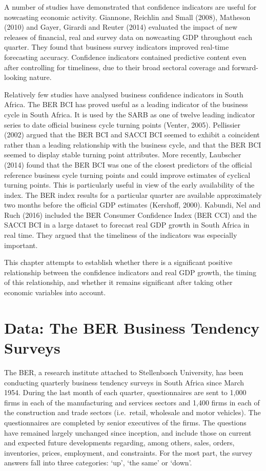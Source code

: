 \documentclass[11pt,]{article}
\begin{document}
A number of studies have demonstrated that confidence indicators are
useful for nowcasting economic activity. Giannone, Reichlin and Small
(2008), Matheson (2010) and Gayer, Girardi and Reuter (2014) evaluated
the impact of new releases of financial, real and survey data on
nowcasting GDP throughout each quarter. They found that business survey
indicators improved real-time forecasting accuracy. Confidence
indicators contained predictive content even after controlling for
timeliness, due to their broad sectoral coverage and forward-looking
nature.

Relatively few studies have analysed business confidence indicators in
South Africa. The BER BCI has proved useful as a leading indicator of
the business cycle in South Africa. It is used by the SARB as one of
twelve leading indicator series to date official business cycle turning
points (Venter, 2005). Pellissier (2002) argued that the BER BCI and
SACCI BCI seemed to exhibit a coincident rather than a leading
relationship with the business cycle, and that the BER BCI seemed to
display stable turning point attributes. More recently, Laubscher (2014)
found that the BER BCI was one of the closest predictors of the official
reference business cycle turning points and could improve estimates of
cyclical turning points. This is particularly useful in view of the
early availability of the index. The BER index results for a particular
quarter are available approximately two months before the official GDP
estimates (Kershoff, 2000). Kabundi, Nel and Ruch (2016) included the
BER Consumer Confidence Index (BER CCI) and the SACCI BCI in a large
dataset to forecast real GDP growth in South Africa in real time. They
argued that the timeliness of the indicators was especially important.

This chapter attempts to establish whether there is a significant
positive relationship between the confidence indicators and real GDP
growth, the timing of this relationship, and whether it remains
significant after taking other economic variables into account.

\section{Data: The BER Business Tendency
Surveys}\label{data-the-ber-business-tendency-surveys}

The BER, a research institute attached to Stellenbosch University, has
been conducting quarterly business tendency surveys in South Africa
since March 1954. During the last month of each quarter, questionnaires
are sent to 1,000 firms in each of the manufacturing and services
sectors and 1,400 firms in each of the construction and trade sectors
(i.e.~retail, wholesale and motor vehicles). The questionnaires are
completed by senior executives of the firms. The questions have remained
largely unchanged since inception, and include those on current and
expected future developments regarding, among others, sales, orders,
inventories, prices, employment, and constraints. For the most part, the
survey answers fall into three categories: `up', `the same' or `down'.
\end{document}
